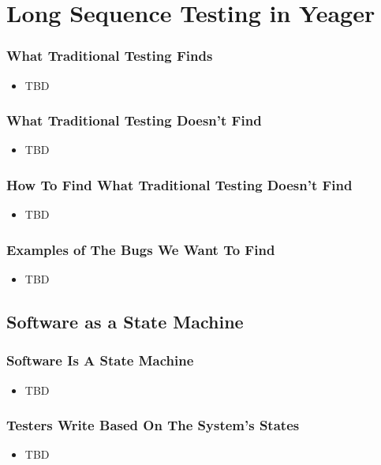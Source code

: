 \section{Long Sequence Testing in Yeager}

\begin{frame}
  \frametitle{What Traditional Testing Finds}
  \begin{itemize}
    \item TBD
  \end{itemize}
\end{frame}

\begin{frame}
  \frametitle{What Traditional Testing Doesn't Find}
  \begin{itemize}
    \item TBD
  \end{itemize}
\end{frame}

\begin{frame}
  \frametitle{How To Find What Traditional Testing Doesn't Find}
  \begin{itemize}
    \item TBD
  \end{itemize}
\end{frame}

\begin{frame}
  \frametitle{Examples of The Bugs We Want To Find}
  \begin{itemize}
    \item TBD
  \end{itemize}
\end{frame}

\subsection{Software as a State Machine}
\begin{frame}
  \frametitle{Software Is A State Machine}
  \begin{itemize}
    \item TBD
  \end{itemize}
\end{frame}

\begin{frame}
  \frametitle{Testers Write Based On The System's States}
  \begin{itemize}
    \item TBD
  \end{itemize}
\end{frame}

